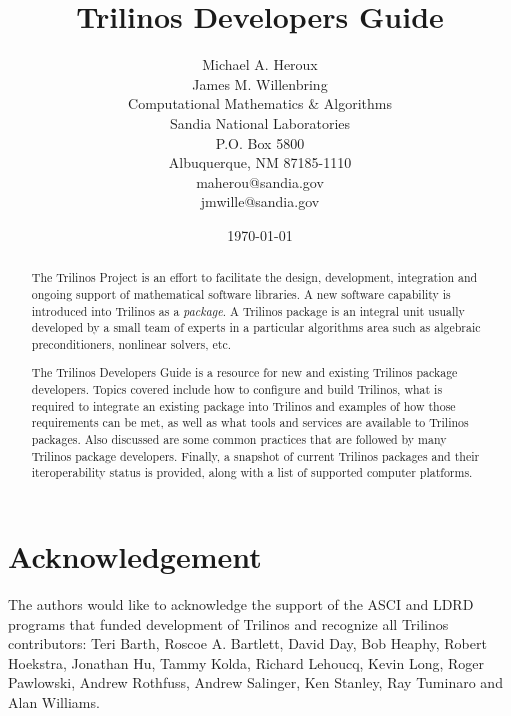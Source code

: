 \documentclass[12pt,relax]{TrilinosDevGuide}
\title{Trilinos Developers Guide}
\author{Michael A. Heroux \\
	    James M. Willenbring\\
      	    Computational Mathematics \& Algorithms \\
	    Sandia National Laboratories\\
	    P.O. Box 5800\\
	    Albuquerque, NM 87185-1110 \\
	    maherou@sandia.gov \\
	    jmwille@sandia.gov \\
	 }
\date{\today} %
\begin{document}
\maketitle

\begin{abstract}

The Trilinos Project is an effort to facilitate the design, development,
integration and ongoing support of mathematical software libraries.
A new software capability is introduced into Trilinos as a {\it
package}.  A Trilinos package is an integral unit usually developed by
a small team of experts in a particular algorithms area such as
algebraic preconditioners, nonlinear solvers, etc.

The Trilinos Developers Guide is a resource for new and existing
Trilinos package developers.  Topics covered include how to configure and 
build Trilinos, what is required to integrate an existing package into Trilinos
and examples of how those requirements can be met, as well as what
tools and services are 
available to Trilinos packages.  Also discussed are some common practices that 
are followed by many Trilinos package developers.  Finally, a snapshot
of current Trilinos packages and their iteroperability status
is provided, along with a list of supported computer platforms.

\end{abstract}


\section*{Acknowledgement}
The authors would like to acknowledge the support of the ASCI and LDRD 
programs that funded development of Trilinos and recognize all Trilinos 
contributors: Teri Barth, Roscoe A. Bartlett, David Day, Bob Heaphy, 
Robert Hoekstra, Jonathan Hu, Tammy Kolda, Richard Lehoucq, Kevin Long, 
Roger Pawlowski, Andrew Rothfuss, Andrew Salinger, Ken Stanley, Ray 
Tuminaro and Alan Williams.

\clearpage
\tableofcontents
\listoffigures
\listoftables

\clearpage
\end{document}
